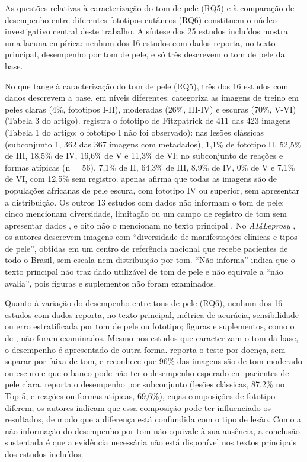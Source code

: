 As questões relativas à caracterização do tom de pele (RQ5) e à comparação de desempenho
entre diferentes fototipos cutâneos (RQ6) constituem o núcleo investigativo central deste
trabalho. A síntese dos 25 estudos incluídos mostra uma lacuna empírica: nenhum dos 16 estudos com dados
reporta, no texto principal, desempenho por tom de pele, e só três descrevem o tom de pele da base.

No que tange à caracterização do tom de pele (RQ5), três dos 16 estudos com dados descrevem a base,
em níveis diferentes.  categoriza as imagens de treino em peles claras (4\%,
fototipos I-II), moderadas (26\%, III-IV) e escuras (70\%, V-VI) (Tabela 3 do artigo).
 registra o fototipo de Fitzpatrick de 411 das 423 imagens (Tabela 1 do artigo; o
fototipo I não foi observado): nas lesões clássicas (subconjunto 1, 362 das 367 imagens com metadados), 1,1\% de fototipo II, 52,5\%
de III, 18,5\% de IV, 16,6\% de V e 11,3\% de VI; no subconjunto de reações e formas atípicas (n = 56),
7,1\% de II, 64,3\% de III, 8,9\% de IV, 0\% de V e 7,1\% de VI, com 12,5\% sem registro.
 apenas afirma que todas as imagens são de populações africanas de pele escura,
com fototipo IV ou superior, sem apresentar a distribuição. Os outros 13 estudos com dados não informam
o tom de pele: cinco mencionam diversidade, limitação ou um campo de registro de tom sem apresentar dados
,
e oito não o mencionam no texto principal
.
No \textit{AI4Leprosy} , os autores descrevem imagens com ``diversidade de manifestações
clínicas e tipos de pele'', obtidas em um centro de referência nacional que recebe pacientes de todo o Brasil,
sem escala nem distribuição por tom. ``Não informa'' indica que o texto principal não traz dado utilizável
de tom de pele e não equivale a ``não avalia'', pois figuras e suplementos não foram examinados.

Quanto à variação do desempenho entre tons de pele (RQ6), nenhum dos 16 estudos com dados reporta, no
texto principal, métrica de acurácia, sensibilidade ou erro estratificada por tom de pele ou fototipo;
figuras e suplementos, como o de , não foram examinados. Mesmo nos estudos que
caracterizam o tom da base, o desempenho é apresentado de outra forma.  reporta o teste
por doença, sem separar por faixa de tom, e reconhece que 96\% das imagens são de tom moderado ou escuro e
que o banco pode não ter o desempenho esperado em pacientes de pele clara.  reporta o
desempenho por subconjunto (lesões clássicas, 87,2\% no Top-5, e reações ou formas atípicas, 69,6\%), cujas
composições de fototipo diferem; os autores indicam que essa composição pode ter influenciado os resultados,
de modo que a diferença está confundida com o tipo de lesão. Como a não informação do desempenho por tom não
equivale à sua ausência, a conclusão sustentada é que a evidência necessária não está disponível nos textos
principais dos estudos incluídos.

